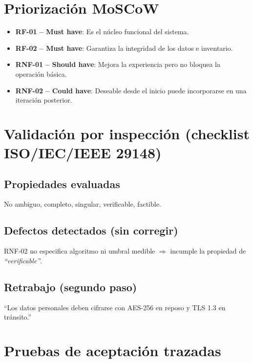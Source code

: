 \documentclass[11pt,a4paper]{article}
\begin{document}
\section{Priorización MoSCoW}

\begin{itemize}[leftmargin=1.2cm]
  \item \textbf{RF-01 -- Must have}: Es el núcleo funcional del sistema.
  \item \textbf{RF-02 -- Must have}: Garantiza la integridad de los datos e inventario.
  \item \textbf{RNF-01 -- Should have}: Mejora la experiencia pero no bloquea la operación básica.
  \item \textbf{RNF-02 -- Could have}: Deseable desde el inicio puede incorporarse en una iteración posterior.
\end{itemize}

\section{Validación por inspección (checklist ISO/IEC/IEEE 29148)}

\subsection*{Propiedades evaluadas}
No ambiguo, completo, singular, verificable, factible.

\subsection*{Defectos detectados (sin corregir)}
RNF-02 no especifica algoritmo ni umbral medible
$\Rightarrow$ incumple la propiedad de \emph{``verificable''}.

\subsection*{Retrabajo (segundo paso)}
``Los datos personales deben cifrarse con AES-256 en reposo y TLS 1.3 en tránsito.''

\section{Pruebas de aceptación trazadas}
\end{document}
